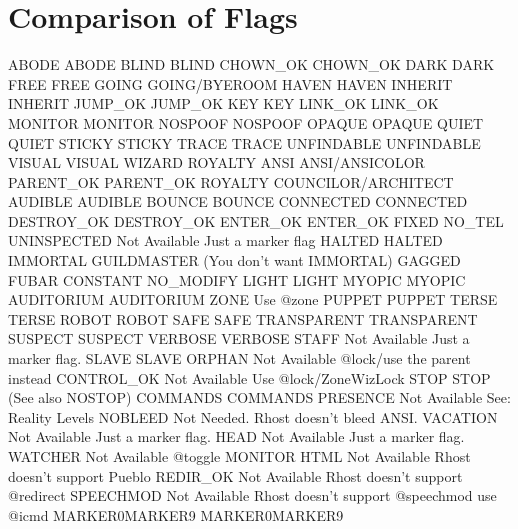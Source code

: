 \documentclass[letterpaper,10pt,english]{sphinxmanual}
\begin{document}
\chapter{Comparison of Flags}
\label{\detokenize{flags:comparison-of-flags}}\label{\detokenize{flags::doc}}
\sphinxAtStartPar
ABODE           \sphinxhyphen{} ABODE
BLIND           \sphinxhyphen{} BLIND
CHOWN\_OK        \sphinxhyphen{} CHOWN\_OK
DARK            \sphinxhyphen{} DARK
FREE            \sphinxhyphen{} FREE
GOING           \sphinxhyphen{} GOING/BYEROOM
HAVEN           \sphinxhyphen{} HAVEN
INHERIT         \sphinxhyphen{} INHERIT
JUMP\_OK         \sphinxhyphen{} JUMP\_OK
KEY             \sphinxhyphen{} KEY
LINK\_OK         \sphinxhyphen{} LINK\_OK
MONITOR         \sphinxhyphen{} MONITOR
NOSPOOF         \sphinxhyphen{} NOSPOOF
OPAQUE          \sphinxhyphen{} OPAQUE
QUIET           \sphinxhyphen{} QUIET
STICKY          \sphinxhyphen{} STICKY
TRACE           \sphinxhyphen{} TRACE
UNFINDABLE      \sphinxhyphen{} UNFINDABLE
VISUAL          \sphinxhyphen{} VISUAL
WIZARD          \sphinxhyphen{} ROYALTY
ANSI            \sphinxhyphen{} ANSI/ANSICOLOR
PARENT\_OK       \sphinxhyphen{} PARENT\_OK
ROYALTY         \sphinxhyphen{} COUNCILOR/ARCHITECT
AUDIBLE         \sphinxhyphen{} AUDIBLE
BOUNCE          \sphinxhyphen{} BOUNCE
CONNECTED       \sphinxhyphen{} CONNECTED
DESTROY\_OK      \sphinxhyphen{} DESTROY\_OK
ENTER\_OK        \sphinxhyphen{} ENTER\_OK
FIXED           \sphinxhyphen{} NO\_TEL
UNINSPECTED     \sphinxhyphen{} Not Available \sphinxhyphen{} Just a marker flag
HALTED          \sphinxhyphen{} HALTED
IMMORTAL        \sphinxhyphen{} GUILDMASTER (You don’t want IMMORTAL)
GAGGED          \sphinxhyphen{} FUBAR
CONSTANT        \sphinxhyphen{} NO\_MODIFY
LIGHT           \sphinxhyphen{} LIGHT
MYOPIC          \sphinxhyphen{} MYOPIC
AUDITORIUM      \sphinxhyphen{} AUDITORIUM
ZONE            \sphinxhyphen{} Use @zone
PUPPET          \sphinxhyphen{} PUPPET
TERSE           \sphinxhyphen{} TERSE
ROBOT           \sphinxhyphen{} ROBOT
SAFE            \sphinxhyphen{} SAFE
TRANSPARENT     \sphinxhyphen{} TRANSPARENT
SUSPECT         \sphinxhyphen{} SUSPECT
VERBOSE         \sphinxhyphen{} VERBOSE
STAFF           \sphinxhyphen{} Not Available \sphinxhyphen{} Just a marker flag.
SLAVE           \sphinxhyphen{} SLAVE
ORPHAN          \sphinxhyphen{} Not Available \sphinxhyphen{} @lock/use the parent instead
CONTROL\_OK      \sphinxhyphen{} Not Available \sphinxhyphen{} Use @lock/ZoneWizLock
STOP            \sphinxhyphen{} STOP (See also NOSTOP)
COMMANDS        \sphinxhyphen{} COMMANDS
PRESENCE        \sphinxhyphen{} Not Available \sphinxhyphen{} See: Reality Levels
NOBLEED         \sphinxhyphen{} Not Needed.  Rhost doesn’t bleed ANSI.
VACATION        \sphinxhyphen{} Not Available \sphinxhyphen{} Just a marker flag.
HEAD            \sphinxhyphen{} Not Available \sphinxhyphen{} Just a marker flag.
WATCHER         \sphinxhyphen{} Not Available \sphinxhyphen{} @toggle MONITOR
HTML            \sphinxhyphen{} Not Available \sphinxhyphen{} Rhost doesn’t support Pueblo
REDIR\_OK        \sphinxhyphen{} Not Available \sphinxhyphen{} Rhost doesn’t support @redirect
SPEECHMOD       \sphinxhyphen{} Not Available \sphinxhyphen{} Rhost doesn’t support @speechmod \sphinxhyphen{} use @icmd
MARKER0\sphinxhyphen{}MARKER9 \sphinxhyphen{} MARKER0\sphinxhyphen{}MARKER9
\end{document}
